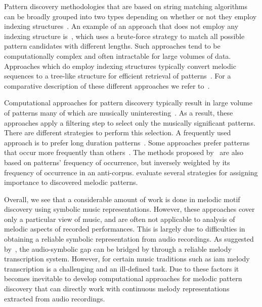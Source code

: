 Pattern discovery methodologies that are based on string matching algorithms can be broadly grouped into two types depending on whether or not they employ indexing structures~\cite{Janssen2013}. An example of an approach that does not employ any indexing structure is~\citep{nieto2012perceptual}, which uses a brute-force strategy to match all possible pattern candidates with different lengths. Such approaches tend to be computationally complex and often intractable for large volumes of data. Approaches which do employ indexing structures typically convert melodic sequences to a tree-like structure for efficient retrieval of patterns~\citep{Knopke2009,conklin2011comparative}. For a comparative description of these different approaches we refer to~\citep{Janssen2013,meredith2002algorithms}.

Computational approaches for pattern discovery typically result in large volume of patterns many of which are musically uninteresting~\citep{marsden2012counselling,conklin2010discovery}. As a result, these approaches apply a filtering step to select only the musically significant patterns. There are different strategies to perform this selection. A frequently used approach is to prefer long duration patterns~\citep{Cambouropoulos2006,Karydis2006}. Some approaches prefer patterns that occur more frequently than others~\citep{Cambouropoulos2006,meredith2002algorithms}. The methods proposed by~\cite{conklin2010discovery,Conklin2010a} are also based on patterns' frequency of occurrence, but inversely weighted by its frequency of occurrence in an anti-corpus. \cite{collins2011modeling} evaluate several strategies for assigning importance to discovered melodic patterns.

Overall, we see that a considerable amount of work is done in melodic motif discovery using symbolic music representations. However, these approaches cover only a particular view of music, and are often not applicable to analysis of melodic aspects of recorded performances. This is largely due to difficulties in obtaining a reliable symbolic representation from audio recordings. As suggested by~\cite{collins2014bridging}, the audio-symbolic gap can be bridged by through a reliable melody transcription system. However, for certain music traditions such as \gls{iam} melody transcription is a challenging and an ill-defined task. Due to these factors it becomes inevitable to develop computational approaches for melodic pattern discovery that can directly work with continuous melody representations extracted from audio recordings.


